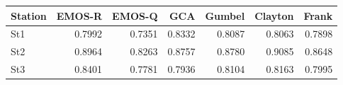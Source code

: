 \begin{table}[ht]
\centering
\begin{tabular}{lrrrrrr}
  \hline
Station & EMOS-R & EMOS-Q & GCA & Gumbel & Clayton & Frank \\ 
  \hline
St1 & 0.7992 & 0.7351 & 0.8332 & 0.8087 & 0.8063 & 0.7898 \\ 
  St2 & 0.8964 & 0.8263 & 0.8757 & 0.8780 & 0.9085 & 0.8648 \\ 
  St3 & 0.8401 & 0.7781 & 0.7936 & 0.8104 & 0.8163 & 0.7995 \\ 
   \hline
\end{tabular}
\end{table}
